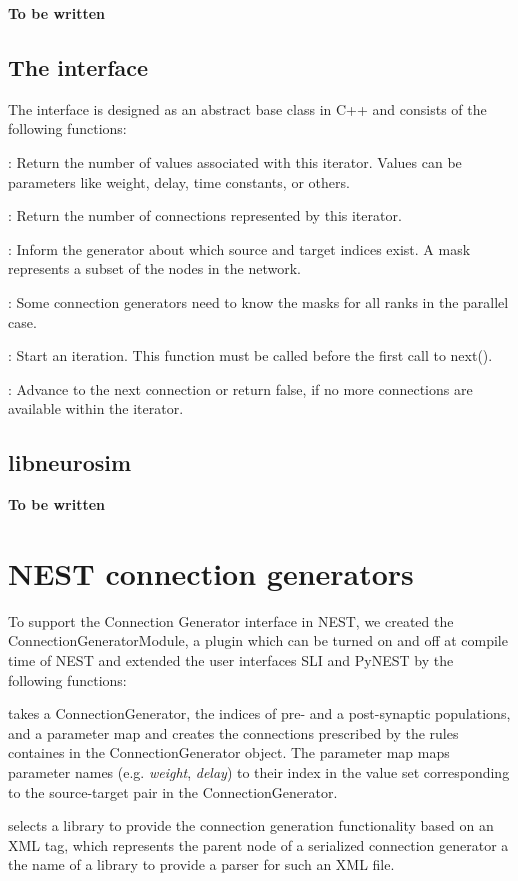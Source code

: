 \documentclass{frontiersSCNS} %
\newcommand{\tbw}[1]{{\bf\parindent0pt\color{red}#1}}
\begin{document}
\tbw{To be written}

\subsection{The interface}

The interface is designed as an abstract base class in C++ and
consists of the following functions:

\begin{unlist}
\item[\tt int arity()]: Return the number of values associated with this
  iterator. Values can be parameters like weight, delay, time
  constants, or others.
\item[\tt int size()]: Return the number of connections represented by
  this iterator.
\item[\tt void setMask(Mask\& mask)]: Inform the generator about which
  source and target indices exist. A mask represents a subset of the
  nodes in the network.
\item[\tt void setMask(std::vector$<$Mask$>$\& masks, int local)]: Some
  connection generators need to know the masks for all ranks in the
  parallel case.
\item[\tt void start()]: Start an iteration. This function must be called
  before the first call to next().
\item[\tt bool next(int\& source, int\& target, double* value)]: Advance
  to the next connection or return false, if no more connections are
  available within the iterator.
\end{unlist}

\subsection{libneurosim}
\tbw{To be written}

\section{NEST connection generators}\label{sec:conn_gen_nest}

To support the Connection Generator interface in NEST, we created the
ConnectionGeneratorModule, a plugin which can be turned on and off at
compile time of NEST and extended the user interfaces SLI and PyNEST
by the following functions:

\begin{unlist}
\item[\tt CGConnect\ ] takes a ConnectionGenerator, the indices of pre-
  and a post-synaptic populations, and a parameter map and creates the
  connections prescribed by the rules containes in the
  ConnectionGenerator object. The parameter map maps parameter names
  (e.g.  \emph{weight}, \emph{delay}) to their index in the value set
  corresponding to the source-target pair in the ConnectionGenerator.
\item[\tt CGSelectImplementation\ ] selects a library to provide the
  connection generation functionality based on an XML tag, which
  represents the parent node of a serialized connection generator a
  the name of a library to provide a parser for such an XML file.
\end{unlist}
\end{document}
